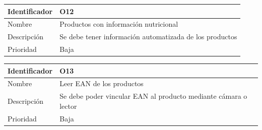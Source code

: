 \vspace{1em}
\par
\begin{tabular}{||p{3cm}|p{11cm}||} 
\hline
Identificador & O12 \\ [0.5ex] 
\hline\hline
Nombre & Productos con información nutricional \\ 
\hline
Descripción & Se debe tener información automatizada de los productos \\
\hline
Prioridad & Baja \\ [1ex] 
\hline
\end{tabular}

\vspace{1em}
\par
\begin{tabular}{||p{3cm}|p{11cm}||} 
\hline
Identificador & O13 \\ [0.5ex] 
\hline\hline
Nombre & Leer EAN de los productos \\ 
\hline
Descripción & Se debe poder vincular EAN al producto mediante cámara o lector \\
\hline
Prioridad & Baja \\ [1ex] 
\hline
\end{tabular}

